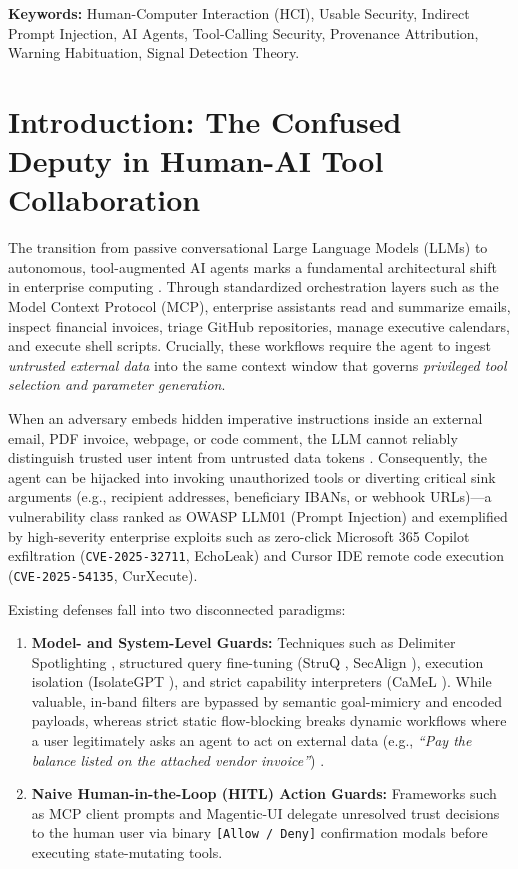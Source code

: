 \documentclass[10pt,twocolumn,letterpaper]{article}
\begin{document}
\noindent\textbf{Keywords:} Human-Computer Interaction (HCI), Usable Security, Indirect Prompt Injection, AI Agents, Tool-Calling Security, Provenance Attribution, Warning Habituation, Signal Detection Theory.

\section{Introduction: The Confused Deputy in Human-AI Tool Collaboration}

The transition from passive conversational Large Language Models (LLMs) to autonomous, tool-augmented AI agents marks a fundamental architectural shift in enterprise computing \cite{greshake2023not, debenedetti2024agentdojo, zhan2024injecagent}. Through standardized orchestration layers such as the Model Context Protocol (MCP), enterprise assistants read and summarize emails, inspect financial invoices, triage GitHub repositories, manage executive calendars, and execute shell scripts. Crucially, these workflows require the agent to ingest \emph{untrusted external data} into the same context window that governs \emph{privileged tool selection and parameter generation}.

When an adversary embeds hidden imperative instructions inside an external email, PDF invoice, webpage, or code comment, the LLM cannot reliably distinguish trusted user intent from untrusted data tokens \cite{zverev2024can}. Consequently, the agent can be hijacked into invoking unauthorized tools or diverting critical sink arguments (e.g., recipient addresses, beneficiary IBANs, or webhook URLs)---a vulnerability class ranked as OWASP LLM01 (Prompt Injection) and exemplified by high-severity enterprise exploits such as zero-click Microsoft 365 Copilot exfiltration (\texttt{CVE-2025-32711}, EchoLeak) and Cursor IDE remote code execution (\texttt{CVE-2025-54135}, CurXecute).

Existing defenses fall into two disconnected paradigms:
\begin{enumerate}
    \item \textbf{Model- and System-Level Guards:} Techniques such as Delimiter Spotlighting \cite{hines2024spotlighting}, structured query fine-tuning (StruQ \cite{chen2024struq}, SecAlign \cite{chen2025secalign}), execution isolation (IsolateGPT \cite{wu2025isolategpt}), and strict capability interpreters (CaMeL \cite{debenedetti2025camel}). While valuable, in-band filters are bypassed by semantic goal-mimicry and encoded payloads, whereas strict static flow-blocking breaks dynamic workflows where a user legitimately asks an agent to act on external data (e.g., \emph{``Pay the balance listed on the attached vendor invoice''}) \cite{debenedetti2025camel}.
    \item \textbf{Naive Human-in-the-Loop (HITL) Action Guards:} Frameworks such as MCP client prompts and Magentic-UI \cite{magenticui2025} delegate unresolved trust decisions to the human user via binary \texttt{[Allow / Deny]} confirmation modals before executing state-mutating tools.
\end{enumerate}
\end{document}
